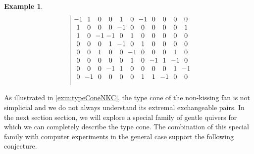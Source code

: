 \documentclass{amsart}
\theoremstyle{definition}
\newtheorem{example}[theorem]{Example}
\newcommand{\vincent}[1]{\todo[color=blue!30]{#1 \\ \hfill --- V.}}
\begin{document}
\begin{example}
\[\begin{array}{r|c@{\;}c@{\;}c@{\;}c@{\;}c@{\;}c@{\;}c@{\;}c@{\;}c@{\;}c@{\;}c}
					& -1 & 1 & 0 & 0 & 1 & 0 & -1 & 0 & 0 & 0 & 0 \\
					& 1 & 0 & 0 & 0 & -1 & 0 & 0 & 0 & 0 & 0 & 1 \\
					& 1 & 0 & -1 & -1 & 0 & 1 & 0 & 0 & 0 & 0 & 0 \\
					& 0 & 0 & 0 & 1 & -1 & 0 & 1 & 0 & 0 & 0 & 0 \\
					& 0 & 0 & 1 & 0 & 0 & -1 & 0 & 0 & 0 & 1 & 0 \\
					& 0 & 0 & 0 & 0 & 0 & 1 & 0 & -1 & 1 & -1 & 0 \\
					& 0 & 0 & 0 & -1 & 1 & 0 & 0 & 0 & 0 & 1 & -1 \\
					& 0 & -1 & 0 & 0 & 0 & 0 & 1 & 1 & -1 & 0 & 0 \\[.2cm]
\end{array}
\]

%
%
\vincent{Todo}
\end{example}

As illustrated in \cref{exm:typeConeNKC}, the type cone of the non-kissing fan is not simplicial and we do not always understand its extremal exchangeable pairs.
In the next section section, we will explore a special family of gentle quivers for which we can completely describe the type cone.
The combination of this special family with computer experiments in the general case support the following conjecture.
\end{document}
